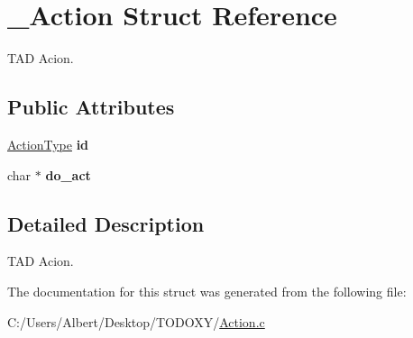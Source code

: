 \hypertarget{struct___action}{\section{\-\_\-\-Action Struct Reference}
\label{struct___action}
}


T\-A\-D Acion.  


\subsection*{Public Attributes}
\begin{DoxyCompactItemize}
\item 
\hypertarget{struct___action_a3fdd9d99453648c5570c715df89e759e}{\hyperlink{_action_8h_a21d5e8f8cdaa838586b31007df0a950b}{Action\-Type} {\bfseries id}}\label{struct___action_a3fdd9d99453648c5570c715df89e759e}

\item 
\hypertarget{struct___action_a516582333e34942543dbbee258a68eb0}{char $\ast$ {\bfseries do\-\_\-act}}\label{struct___action_a516582333e34942543dbbee258a68eb0}

\end{DoxyCompactItemize}


\subsection{Detailed Description}
T\-A\-D Acion. 


\begin{DoxyItemize}
\item 
\end{DoxyItemize}

The documentation for this struct was generated from the following file\-:\begin{DoxyCompactItemize}
\item 
C\-:/\-Users/\-Albert/\-Desktop/\-T\-O\-D\-O\-X\-Y/\hyperlink{_action_8c}{Action.\-c}\end{DoxyCompactItemize}
